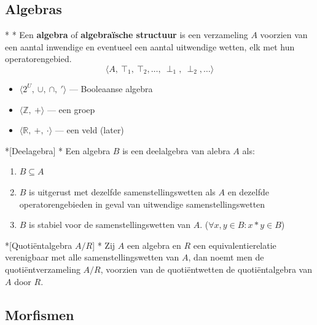 \subsection{Algebras}

\begin{nicedefinition}*
    \nextpart[]*
    Een \textcolor{PineGreen!75!black}{\textbf{algebra}} of \textcolor{PineGreen!75!black}{\textbf{algebraïsche structuur}} is een verzameling $A$ voorzien van een aantal inwendige en eventueel een aantal uitwendige wetten, elk met hun operatorengebied.
    \begin{equation*}
        \langle A,\ \top_1,\ \top_2, \dots,\ \perp_1,\ \perp_2, \dots \rangle
    \end{equation*}
\end{nicedefinition}

\textbf{}
\begin{itemize}
    \item $\langle 2^U,\ \cup,\ \cap,\ '\rangle$ --- Booleaanse algebra 
    \item $\langle \mathbb{Z},\ + \rangle$ --- een groep 
    \item $\langle \mathbb{R},\ +,\ \cdot \rangle$ --- een veld (later) 
\end{itemize}

\begin{nicedefinition}*[Deelagebra]
    \nextpart[]*
    Een algebra $B$ is een deelalgebra van alebra $A$ als:
    \begin{enumerate}
        \item $B \subseteq A$
        \item $B$ is uitgerust met dezelfde samenstellingswetten als $A$ en dezelfde operatorengebieden in geval van uitwendige samenstellingswetten 
        \item $B$ is stabiel voor de samenstellingswetten van $A$. ($\forall x,y \in B: x * y \in B$)
    \end{enumerate}
\end{nicedefinition}

\begin{nicedefinition}*[Quotiëntalgebra $A/R$]
    \nextpart[]*
    Zij $A$ een algebra en $R$ een equivalentierelatie verenigbaar met alle samenstellingswetten van $A$, dan noemt men de quotiëntverzameling $A/R$, voorzien van de quotiëntwetten de quotiëntalgebra van $A$ door $R$.
\end{nicedefinition}

\subsection{Morfismen}

